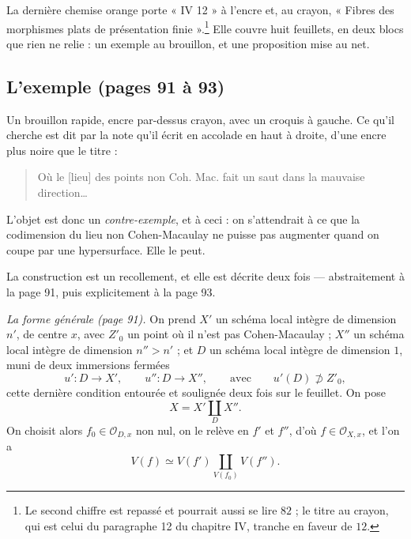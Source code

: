 \documentclass[11pt,a4paper]{article}
\begin{document}
La dernière chemise orange porte « IV 12 » à l'encre et, au crayon, « Fibres des
morphismes plats de présentation finie ».\footnote{Le second chiffre est repassé
et pourrait aussi se lire $82$ ; le titre au crayon, qui est celui du
paragraphe 12 du chapitre IV, tranche en faveur de $12$.} Elle couvre huit
feuillets, en deux blocs que rien ne relie : un exemple au brouillon, et une
proposition mise au net.

\subsection*{L'exemple (pages 91 à 93)}

Un brouillon rapide, encre par-dessus crayon, avec un croquis à gauche. Ce
qu'il cherche est dit par la note qu'il écrit en accolade en haut à droite,
d'une encre plus noire que le titre :

\begin{quote}
Où le [lieu] des points non Coh. Mac. fait un saut dans la mauvaise
direction…
\end{quote}

L'objet est donc un \emph{contre-exemple}, et à ceci : on s'attendrait à ce que
la codimension du lieu non Cohen-Macaulay ne puisse pas augmenter quand on coupe
par une hypersurface. Elle le peut.

La construction est un recollement, et elle est décrite deux fois — abstraitement
à la page 91, puis explicitement à la page 93.

\emph{La forme générale (page 91).} On prend $X'$ un schéma local intègre de
dimension $n'$, de centre $x$, avec $Z'_{0}$ un point où il n'est pas
Cohen-Macaulay ; $X''$ un schéma local intègre de dimension $n'' > n'$ ; et $D$
un schéma local intègre de dimension $1$, muni de deux immersions fermées
\[
  u' : D \to X' , \qquad u'' : D \to X'' ,
  \qquad\text{avec}\qquad u'(D) \not\supset Z'_{0} ,
\]
cette dernière condition entourée et soulignée deux fois sur le feuillet. On
pose
\[
  X = X' \coprod_{D} X'' .
\]
On choisit alors $f_{0} \in \mathcal{O}_{D,x}$ non nul, on le relève en $f'$ et
$f''$, d'où $f \in \mathcal{O}_{X,x}$, et l'on a
\[
  V(f) \simeq V(f') \coprod_{V(f_{0})} V(f'') .
\]
\end{document}
